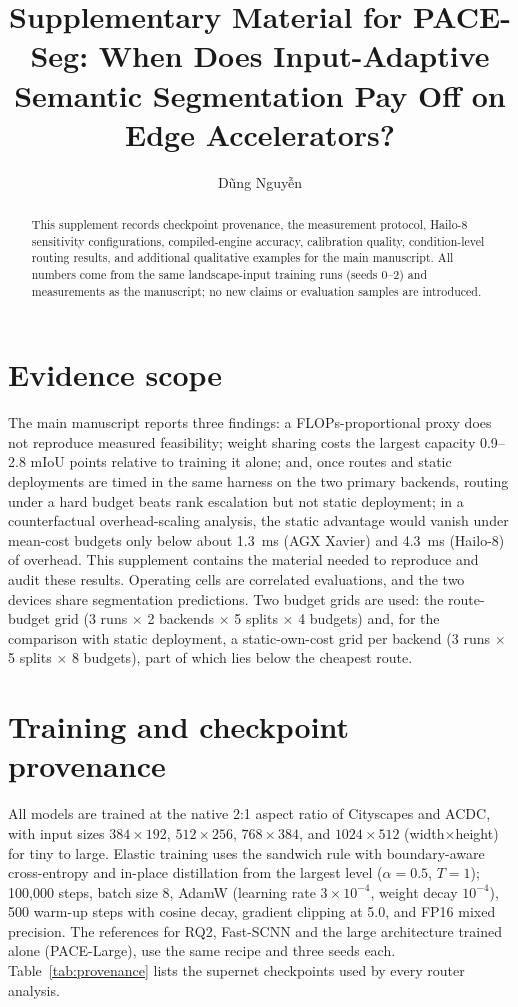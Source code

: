 \documentclass[a4paper,review,12pt]{elsarticle}
\newcommand{\miou}{mIoU}
\begin{document}
\begin{frontmatter}
\title{Supplementary Material for PACE-Seg: When Does Input-Adaptive Semantic Segmentation Pay Off on Edge Accelerators?}
\author{D\~ung Nguy\~{\^e}n}
\begin{abstract}
This supplement records checkpoint provenance, the measurement protocol, Hailo-8 sensitivity configurations, compiled-engine accuracy, calibration quality, condition-level routing results, and additional qualitative examples for the main manuscript. All numbers come from the same landscape-input training runs (seeds 0--2) and measurements as the manuscript; no new claims or evaluation samples are introduced.
\end{abstract}
\end{frontmatter}

\section{Evidence scope}

The main manuscript reports three findings: a FLOPs-proportional proxy does not reproduce measured feasibility; weight sharing costs the largest capacity 0.9--2.8 \miou{} points relative to training it alone; and, once routes and static deployments are timed in the same harness on the two primary backends, routing under a hard budget beats rank escalation but not static deployment; in a counterfactual overhead-scaling analysis, the static advantage would vanish under mean-cost budgets only below about 1.3~ms (AGX Xavier) and 4.3~ms (Hailo-8) of overhead. This supplement contains the material needed to reproduce and audit these results. Operating cells are correlated evaluations, and the two devices share segmentation predictions. Two budget grids are used: the route-budget grid (3 runs $\times$ 2 backends $\times$ 5 splits $\times$ 4 budgets) and, for the comparison with static deployment, a static-own-cost grid per backend (3 runs $\times$ 5 splits $\times$ 8 budgets), part of which lies below the cheapest route.

\section{Training and checkpoint provenance}

All models are trained at the native 2:1 aspect ratio of Cityscapes and ACDC, with input sizes $384\times192$, $512\times256$, $768\times384$, and $1024\times512$ (width$\times$height) for tiny to large. Elastic training uses the sandwich rule with boundary-aware cross-entropy and in-place distillation from the largest level ($\alpha=0.5$, $T=1$); 100,000 steps, batch size 8, AdamW (learning rate $3\times10^{-4}$, weight decay $10^{-4}$), 500 warm-up steps with cosine decay, gradient clipping at 5.0, and FP16 mixed precision. The references for RQ2, Fast-SCNN and the large architecture trained alone (PACE-Large), use the same recipe and three seeds each. Table~\ref{tab:provenance} lists the supernet checkpoints used by every router analysis.
\end{document}

